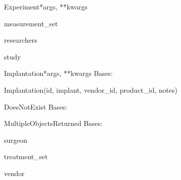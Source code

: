 \documentclass[letterpaper,10pt,english]{sphinxmanual}
\begin{document}
\begin{classdesc}{Experiment}{*args, **kwargs}
\hypertarget{data.models.Experiment.measurement\_set}{}\begin{memberdesc}[Experiment]{measurement\_set}\end{memberdesc}

\hypertarget{data.models.Experiment.researchers}{}\begin{memberdesc}[Experiment]{researchers}\end{memberdesc}

\hypertarget{data.models.Experiment.study}{}\begin{memberdesc}[Experiment]{study}\end{memberdesc}
\end{classdesc}

\hypertarget{data.models.Implantation}{}\begin{classdesc}{Implantation}{*args, **kwargs}
Bases: 

Implantation(id, implant, vendor\_id, product\_id, notes)

\hypertarget{data.models.Implantation.DoesNotExist}{}\begin{excdesc}{DoesNotExist}
Bases: 
\end{excdesc}

\hypertarget{data.models.Implantation.MultipleObjectsReturned}{}\begin{excdesc}{MultipleObjectsReturned}
Bases: 
\end{excdesc}

\hypertarget{data.models.Implantation.surgeon}{}\begin{memberdesc}[Implantation]{surgeon}\end{memberdesc}

\hypertarget{data.models.Implantation.treatment\_set}{}\begin{memberdesc}[Implantation]{treatment\_set}\end{memberdesc}

\hypertarget{data.models.Implantation.vendor}{}\begin{memberdesc}[Implantation]{vendor}\end{memberdesc}
\end{classdesc}
\end{document}
